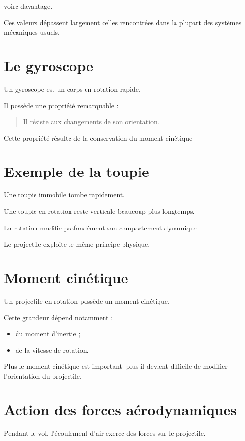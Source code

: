 voire davantage.

Ces valeurs dépassent largement celles rencontrées dans la plupart des
systèmes mécaniques usuels.

\section{Le gyroscope}

Un gyroscope est un corps en rotation rapide.

Il possède une propriété remarquable :

\begin{quote}
Il résiste aux changements de son orientation.
\end{quote}

Cette propriété résulte de la conservation du moment cinétique.

\section{Exemple de la toupie}

Une toupie immobile tombe rapidement.

Une toupie en rotation reste verticale beaucoup plus longtemps.

La rotation modifie profondément son comportement dynamique.

Le projectile exploite le même principe physique.

\section{Moment cinétique}

Un projectile en rotation possède un moment cinétique.

Cette grandeur dépend notamment :

\begin{itemize}
    \item du moment d'inertie ;
    \item de la vitesse de rotation.
\end{itemize}

Plus le moment cinétique est important, plus il devient difficile de modifier
l'orientation du projectile.

\section{Action des forces aérodynamiques}

Pendant le vol, l'écoulement d'air exerce des forces sur le projectile.

